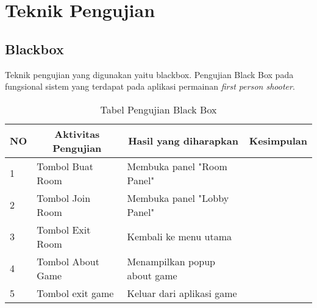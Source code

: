     
    

        \section{Teknik Pengujian}
        \subsection{Blackbox}
Teknik pengujian yang digunakan yaitu blackbox. Pengujian Black Box pada fungsional sistem yang terdapat pada aplikasi permainan \textit{first person shooter}.

    \begin{table}[h]
    \centering
    \caption{Tabel Pengujian Black Box}
    \label{lab:tabel-pengujian}
    \begin{tabular}{|l|l|l|l|}
    \hline
    \multicolumn{1}{|c|}{NO} & \multicolumn{1}{c|}{Aktivitas Pengujian} & \multicolumn{1}{c|}{Hasil yang diharapkan} & \multicolumn{1}{c|}{Kesimpulan} \\ \hline
    1                        & Tombol Buat Room                         & Membuka panel "Room Panel"                 &                                 \\ \hline
    2                        & Tombol Join Room                         & Membuka panel "Lobby Panel"                &                                 \\ \hline
    3                        & Tombol Exit Room                         & Kembali ke menu utama                      &                                 \\ \hline
    4                        & Tombol About Game                        & Menampilkan popup about game               &                                 \\ \hline
    5                        & Tombol exit game                         & Keluar dari aplikasi game                  &                                 \\ \hline
    \end{tabular}
    \end{table}
\newpage        
